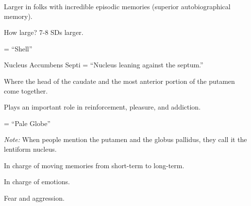 \begin{coloredlist}
\begin{coloredlist}
\begin{coloredlist}
\begin{coloredlist}
\begin{coloredlist}
\begin{coloredlist}
            \end{coloredlist}
        \end{coloredlist}
        \item Larger in folks with incredible episodic memories (superior autobiographical memory).
        \begin{coloredlist}
            \item How large? 7-8 SDs larger.
        \end{coloredlist}
    \end{coloredlist}
    \item {} = ``Shell''
    \item {}
    \begin{coloredlist}
        \item Nucleus Accumbens Septi = ``Nucleus leaning against the septum.''
        \begin{coloredlist}
            \item Where the head of the caudate and the most anterior portion of the putamen come together.
            \item Plays an important role in reinforcement, pleasure, and addiction.
        \end{coloredlist}
    \end{coloredlist}
\end{coloredlist}
\item {} = ``Pale Globe''
\item \textit{Note:} When people mention the putamen and the globus pallidus, they call it the lentiform nucleus.
\begin{coloredlist}
    \item {}
    \begin{coloredlist}
        \item {}
        \begin{coloredlist}
            \item In charge of moving memories from short-term to long-term.
        \end{coloredlist}
        \item {}
        \begin{coloredlist}
            \item In charge of emotions.
            \item Fear and aggression.
        \end{coloredlist}
        \item {}
        \item {}
        \item {}
        \item {}
    \end{coloredlist}
    \item {}
    \item {}


\end{coloredlist}
\end{coloredlist}
\end{coloredlist}
